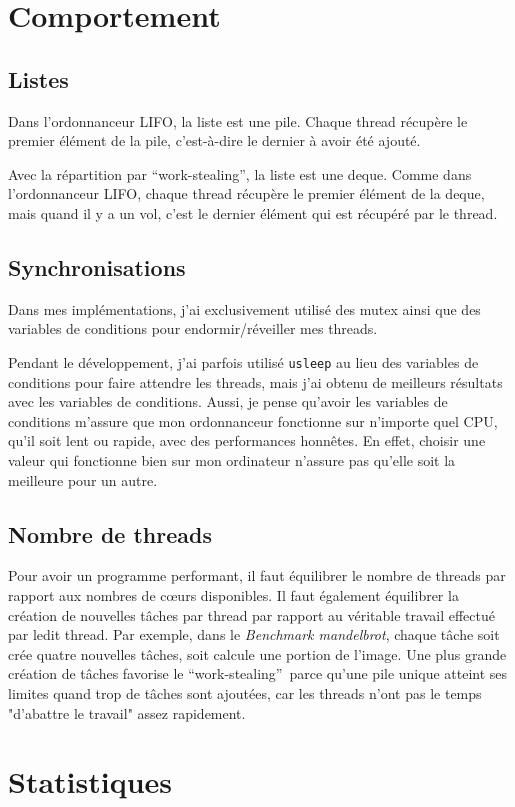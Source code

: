 \documentclass[a4paper]{article}
\def\coeur{c\oe{}ur}
\def\btwo{\textit{Benchmark mandelbrot}}
\def\ws{\enquote{work-stealing}}
\begin{document}
\section{Comportement}

\subsection{Listes}
Dans l'ordonnanceur LIFO, la liste est une pile. Chaque thread récupère le
premier élément de la pile, c'est-à-dire le dernier à avoir été ajouté.

Avec la répartition par \ws, la liste est une deque. Comme dans l'ordonnanceur
LIFO, chaque thread récupère le premier élément de la deque, mais quand il y a
un vol, c'est le dernier élément qui est récupéré par le thread.

\subsection{Synchronisations}
Dans mes implémentations, j'ai exclusivement utilisé des mutex ainsi que des
variables de conditions pour endormir/réveiller mes threads.

Pendant le développement, j'ai parfois utilisé \texttt{usleep} au lieu des
variables de conditions pour faire attendre les threads, mais j'ai obtenu de
meilleurs résultats avec les variables de conditions. Aussi, je pense qu'avoir
les variables de conditions m'assure que mon ordonnanceur fonctionne sur
n'importe quel CPU, qu'il soit lent ou rapide, avec des performances honnêtes.
En effet, choisir une valeur qui fonctionne bien sur mon ordinateur n'assure pas
qu'elle soit la meilleure pour un autre.

\subsection{Nombre de threads}
Pour avoir un programme performant, il faut équilibrer le nombre de threads par
rapport aux nombres de \coeur{}s disponibles. Il faut également équilibrer la
création de nouvelles tâches par thread par rapport au véritable travail
effectué par ledit thread. Par exemple, dans le \btwo, chaque tâche soit crée
quatre nouvelles tâches, soit calcule une portion de l'image. Une plus grande
création de tâches favorise le \ws~parce qu'une pile unique atteint ses limites
quand trop de tâches sont ajoutées, car les threads n'ont pas le temps
"d'abattre le travail" assez rapidement.


\section{Statistiques}\label{sec:stats}
\end{document}
